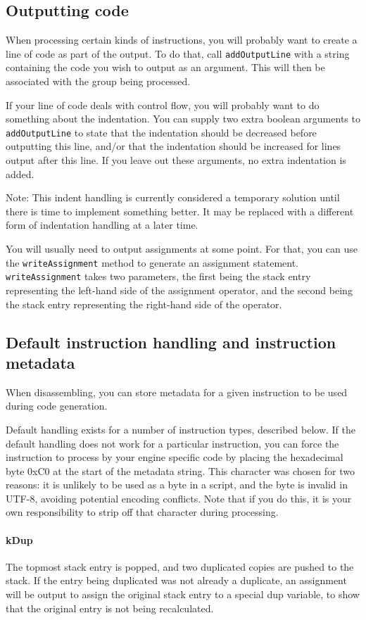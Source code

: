 \subsection{Outputting code}
When processing certain kinds of instructions, you will probably want to create a line of code as part of the output. To do that, call \verb+addOutputLine+ with a string containing the code you wish to output as an argument. This will then be associated with the group being processed.

If your line of code deals with control flow, you will probably want to do something about the indentation. You can supply two extra boolean arguments to \verb+addOutputLine+ to state that the indentation should be decreased before outputting this line, and/or that the indentation should be increased for lines output after this line. If you leave out these arguments, no extra indentation is added.

Note: This indent handling is currently considered a temporary solution until there is time to implement something better. It may be replaced with a different form of indentation handling at a later time.

You will usually need to output assignments at some point. For that, you can use the \verb+writeAssignment+ method to generate an assignment statement. \verb+writeAssignment+ takes two parameters, the first being the stack entry representing the left-hand side of the assignment operator, and the second being the stack entry representing the right-hand side of the operator.

\subsection{Default instruction handling and instruction metadata}
When disassembling, you can store metadata for a given instruction to be used during code generation.

Default handling exists for a number of instruction types, described below. If the default handling does not work for a particular instruction, you can force the instruction to process by your engine specific code by placing the hexadecimal byte 0xC0 at the start of the metadata string. This character was chosen for two reasons: it is unlikely to be used as a byte in a script, and the byte is invalid in UTF-8, avoiding potential encoding conflicts. Note that if you do this, it is your own responsibility to strip off that character during processing.

\paragraph{kDup}
The topmost stack entry is popped, and two duplicated copies are pushed to the stack. If the entry being duplicated was not already a duplicate, an assignment will be output to assign the original stack entry to a special dup variable, to show that the original entry is not being recalculated.

